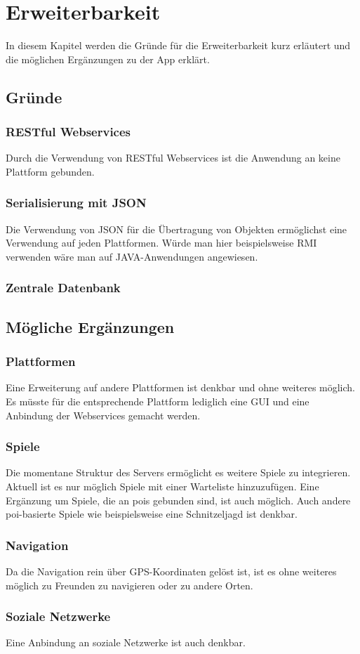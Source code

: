 \chapter{Erweiterbarkeit}
In diesem Kapitel werden die Gründe für die Erweiterbarkeit kurz erläutert und die möglichen Ergänzungen zu der App erklärt.


\section{Gründe}
\subsection{RESTful Webservices}
Durch die Verwendung von RESTful Webservices ist die Anwendung an keine Plattform gebunden.

\subsection{Serialisierung mit JSON}
Die Verwendung von JSON für die Übertragung von Objekten ermöglichst eine Verwendung auf jeden Plattformen. Würde man hier beispielsweise RMI verwenden wäre man auf JAVA-Anwendungen angewiesen.


\subsection{Zentrale Datenbank}


\section{Mögliche Ergänzungen}
\subsection{Plattformen}
Eine Erweiterung auf andere Plattformen ist denkbar und ohne weiteres möglich. Es müsste für die entsprechende Plattform lediglich eine GUI und eine Anbindung der Webservices gemacht werden.

\subsection{Spiele}
Die momentane Struktur des Servers ermöglicht es weitere Spiele zu integrieren. Aktuell ist es nur möglich Spiele mit einer Warteliste hinzuzufügen. Eine Ergänzung um Spiele, die an \glspl{poi} gebunden sind, ist auch möglich. Auch andere \gls{poi}-basierte Spiele wie beispielsweise eine Schnitzeljagd ist denkbar.

\subsection{Navigation}
Da die Navigation rein über GPS-Koordinaten gelöst ist, ist es ohne weiteres möglich zu Freunden zu navigieren oder zu andere Orten.

\subsection{Soziale Netzwerke}
Eine Anbindung an soziale Netzwerke ist auch denkbar.